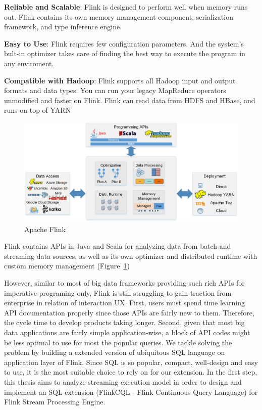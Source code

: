 \textbf{Reliable and Scalable}: Flink is designed to perform well when memory runs out.  Flink contains its own memory management component, serialization framework, and type inference engine.

\textbf{Easy to Use}: Flink requires few configuration parameters. And the system's bult-in optimizer takes care of finding the best way to execute the program in any enviroment.

\textbf{Compatible with Hadoop}: Flink supports all Hadoop input and output formats and data types. You can run your legacy MapReduce operators unmodified and faster on Flink. Flink can read data from HDFS and HBase, and runs on top of YARN

\begin{figure}[htbp!] 
\centering    
\includegraphics[width=1\textwidth]{ApacheFlink}
\caption{Apache Flink}
\label{fig:flink}
\end{figure}


Flink contains APIs in Java and Scala for analyzing data from batch and streaming data sources, as well as its own optimizer and distributed runtime with custom memory management (Figure~\ref{fig:flink})

However, similar to most of big data frameworks providing such rich APIs for imperative programing only, Flink is still struggling to gain traction from enterprise in relation of interaction UX.  First, users must spend time learning API documentation properly since those APIs are fairly new to them. Therefore, the cycle time to develop products taking longer. Second, given that most big data applications are fairly simple application-wise, a block of API codes might be less optimal to use for most the popular queries. We tackle solving the problem by building a extended version of ubiquitous SQL language on application layer of Flink. Since SQL is so popular, compact, well-design and easy to use, it is the most suitable choice to rely on for our extension. In the first step, this thesis aims to analyze streaming execution model in order to design and implement an SQL-extension (FlinkCQL - Flink Continuous Query Language) for Flink Stream Processing Engine.


